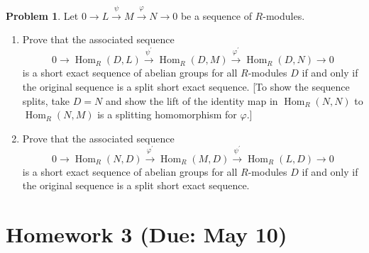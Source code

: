 \documentclass{amsart}
\numberwithin{equation}{section}
\theoremstyle{definition}
\newtheorem{problem}[thm]{Problem}
\begin{document}



\begin{problem}
 Let \(0 \longrightarrow L \xrightarrow{\psi} M \xrightarrow{\varphi} N \longrightarrow 0\) be a sequence of \(R\)-modules.
\begin{enumerate}
 \item Prove that the associated sequence
\[
0 \longrightarrow \operatorname{Hom}_R(D, L) \xrightarrow{\psi^{\prime}} \operatorname{Hom}_R(D, M) \xrightarrow{\varphi^{\prime}} \operatorname{Hom}_R(D, N) \longrightarrow 0
\]
is a short exact sequence of abelian groups for all \(R\)-modules \(D\) if and only if the original sequence is a split short exact sequence. [To show the sequence splits, take \(D=N\) and show the lift of the identity map in \(\operatorname{Hom}_R(N, N)\) to \(\operatorname{Hom}_R(N, {M})\) is a splitting homomorphism for \(\varphi\).]
\item Prove that the associated sequence
\[
0 \longrightarrow \operatorname{Hom}_R(N, D) \xrightarrow{\varphi^{\prime}} \operatorname{Hom}_R(M, D) \xrightarrow{\psi^{\prime}} \operatorname{Hom}_R(L, D) \longrightarrow 0
\]
is a short exact sequence of abelian groups for all \(R\)-modules \(D\) if and only if the original sequence is a split short exact sequence.
\end{enumerate}
\end{problem}




\newpage
\section{Homework 3 (Due: May 10)}
\end{document}
